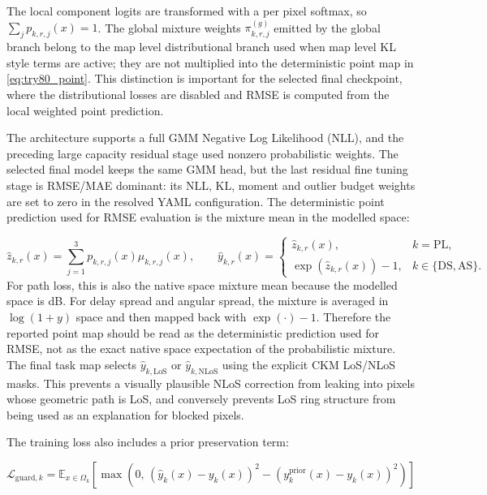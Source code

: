 The local component logits are transformed with a per pixel softmax, so
\(\sum_j p_{k,r,j}(x)=1\). The global mixture weights
\(\pi^{(g)}_{k,r,j}\) emitted by the global branch belong to the map level
distributional branch used when map level KL style terms are active; they are
not multiplied into the deterministic point map in \eqref{eq:try80_point}.
This distinction is important for the selected final checkpoint, where the
distributional losses are disabled and RMSE is computed from the local weighted
point prediction.

The architecture supports a full GMM Negative Log Likelihood (NLL), and the
preceding large capacity residual stage used nonzero probabilistic weights.
The selected final model keeps the same GMM head, but the last residual
fine tuning stage is RMSE/MAE dominant: its NLL, KL, moment and
outlier budget weights are set to zero in the resolved YAML configuration.
The deterministic point prediction used for RMSE evaluation is the mixture
mean in the modelled space:

\begin{equation}
\hat z_{k,r}(x)
=
\sum_{j=1}^3 p_{k,r,j}(x)\mu_{k,r,j}(x),
\qquad
\hat y_{k,r}(x)
=
\begin{cases}
\hat z_{k,r}(x), & k=\mathrm{PL},\\
\exp(\hat z_{k,r}(x))-1, & k\in\{\mathrm{DS},\mathrm{AS}\}.
\end{cases}
\label{eq:try80_point}
\end{equation}
For path loss, this is also the native space mixture mean because the modelled
space is dB. For delay spread and angular spread, the mixture is averaged in
\(\log(1+y)\) space and then mapped back with \(\exp(\cdot)-1\). Therefore the
reported point map should be read as the deterministic prediction used for
RMSE, not as the exact native space expectation of the probabilistic mixture.
The final task map selects \(\hat y_{k,\mathrm{LoS}}\) or
\(\hat y_{k,\mathrm{NLoS}}\) using the explicit CKM LoS/NLoS masks. This
prevents a visually plausible NLoS correction from leaking into pixels whose
geometric path is LoS, and conversely prevents LoS ring structure from being
used as an explanation for blocked pixels.

The training loss also includes a prior preservation term:

\begin{equation}
\mathcal{L}_{\mathrm{guard},k}
=
\mathbb{E}_{x\in\Omega_k}
\left[
\max\left(0,\,
\left(\hat y_k(x) - y_k(x)\right)^2
-
\left(y^{\mathrm{prior}}_k(x) - y_k(x)\right)^2
\right)
\right]
\label{eq:try80_loss}
\end{equation}

